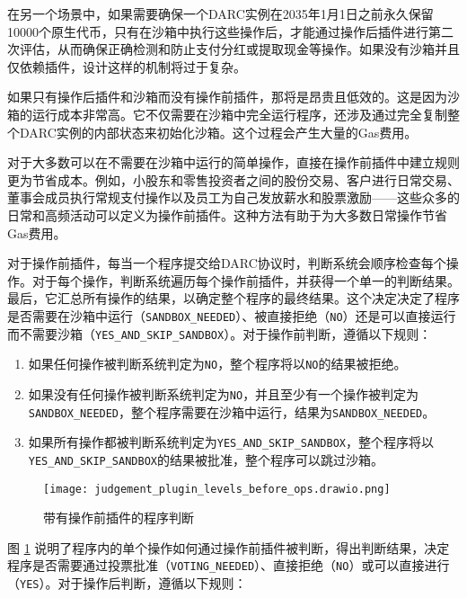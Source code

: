 \documentclass[main.tex]{subfiles}
\begin{document}
在另一个场景中，如果需要确保一个DARC实例在2035年1月1日之前永久保留10000个原生代币，只有在沙箱中执行这些操作后，才能通过操作后插件进行第二次评估，从而确保正确检测和防止支付分红或提取现金等操作。如果没有沙箱并且仅依赖插件，设计这样的机制将过于复杂。


如果只有操作后插件和沙箱而没有操作前插件，那将是昂贵且低效的。这是因为沙箱的运行成本非常高。它不仅需要在沙箱中完全运行程序，还涉及通过完全复制整个DARC实例的内部状态来初始化沙箱。这个过程会产生大量的Gas费用。

对于大多数可以在不需要在沙箱中运行的简单操作，直接在操作前插件中建立规则更为节省成本。例如，小股东和零售投资者之间的股份交易、客户进行日常交易、董事会成员执行常规支付操作以及员工为自己发放薪水和股票激励——这些众多的日常和高频活动可以定义为操作前插件。这种方法有助于为大多数日常操作节省Gas费用。



对于操作前插件，每当一个程序提交给DARC协议时，判断系统会顺序检查每个操作。对于每个操作，判断系统遍历每个操作前插件，并获得一个单一的判断结果。最后，它汇总所有操作的结果，以确定整个程序的最终结果。这个决定决定了程序是否需要在沙箱中运行（\texttt{SANDBOX\_NEEDED}）、被直接拒绝（\texttt{NO}）还是可以直接运行而不需要沙箱（\texttt{YES\_AND\_SKIP\_SANDBOX}）。对于操作前判断，遵循以下规则：

\begin{enumerate}
    \item 如果任何操作被判断系统判定为\texttt{NO}，整个程序将以\texttt{NO}的结果被拒绝。
    \item 如果没有任何操作被判断系统判定为\texttt{NO}，并且至少有一个操作被判定为\texttt{SANDBOX\_NEEDED}，整个程序需要在沙箱中运行，结果为\texttt{SANDBOX\_NEEDED}。
    \item 如果所有操作都被判断系统判定为\texttt{YES\_AND\_SKIP\_SANDBOX}，整个程序将以\texttt{YES\_AND\_SKIP\_SANDBOX}的结果被批准，整个程序可以跳过沙箱。
\end{enumerate}




\begin{figure}
\centering
\texttt{[image: judgement\_plugin\_levels\_before\_ops.drawio.png]}
\caption{\label{fig:judgement-before-op}带有操作前插件的程序判断}
\end{figure}


图 \ref{fig:judgement-before-op} 说明了程序内的单个操作如何通过操作前插件被判断，得出判断结果，决定程序是否需要通过投票批准（\texttt{VOTING\_NEEDED}）、直接拒绝（\texttt{NO}）或可以直接进行（\texttt{YES}）。对于操作后判断，遵循以下规则：
\end{document}
